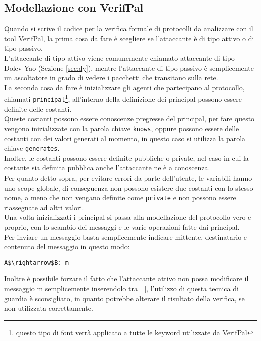 \subsection*{Modellazione con VerifPal}
Quando si scrive il codice per la verifica formale di protocolli da analizzare con il tool VerifPal, la prima cosa da fare è scegliere se l'attaccante è di tipo attivo o di tipo passivo.\\
L'attaccante di tipo attivo viene comunemente chiamato attaccante di tipo Dolev-Yao (Sezione \ref{sec:dy}), mentre l'attaccante di tipo passivo è semplicemente un ascoltatore in grado di vedere i pacchetti che transitano sulla rete.\\
La seconda cosa da fare è inizializzare gli agenti che partecipano al protocollo, chiamati \texttt{principal}\footnote{questo tipo di font verrà applicato a tutte le keyword utilizzate da VerifPal}, all'interno della definizione dei principal possono essere definite delle costanti.\\ 
Queste costanti possono essere conoscenze pregresse del principal, per fare questo vengono inizializzate con la parola chiave \texttt{knows}, oppure possono essere delle costanti con dei valori generati al momento, in questo caso si utilizza la parola chiave \texttt{generates}.\\
Inoltre, le costanti possono essere definite pubbliche o private, nel caso in cui la costante sia definita pubblica anche l'attaccante ne è a conoscenza.\\
Per quanto detto sopra, per evitare errori da parte dell'utente, le variabili hanno uno scope globale, di conseguenza non possono esistere due costanti con lo stesso nome, a meno che non vengano definite come \texttt{private} e non possono essere riassegnate ad altri valori.\\
Una volta inizializzati i principal si passa alla modellazione del protocollo vero e proprio, con lo scambio dei messaggi e le varie operazioni fatte dai principal.\\
Per inviare un messaggio basta semplicemente indicare mittente, destinatario e contenuto del messaggio in questo modo: 
\begin{lstlisting}[mathescape]
    A$\rightarrow$B: m 
\end{lstlisting}
 Inoltre è possibile forzare il fatto che l'attaccante attivo non possa modificare il messaggio m semplicemente inserendolo tra $[$ $]$, l'utilizzo di questa tecnica di guardia è sconsigliato, in quanto potrebbe alterare il risultato della verifica, se non utilizzata correttamente.\\
